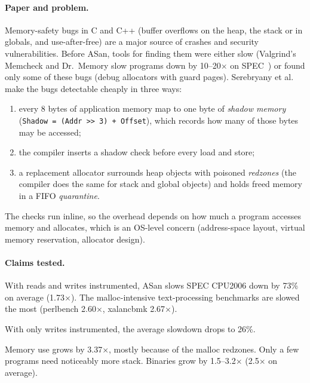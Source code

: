 \documentclass[10pt,a4paper]{article}
\newcommand{\asan}{ASan}
\newcommand{\cmd}[1]{\texttt{#1}}
\begin{document}
\paragraph{Paper and problem.}
Memory-safety bugs in C and C++ (buffer overflows on the heap, the stack or in
globals, and use-after-free) are a major source of crashes and security
vulnerabilities. Before \asan{}, tools for finding them were either slow
(Valgrind's Memcheck and Dr.~Memory slow programs down by 10--20$\times$ on
SPEC~\cite{asan}) or found only some of these bugs (debug allocators with
guard pages). Serebryany et al.~\cite{asan} make the bugs detectable cheaply in
three ways:
\begin{enumerate}
\item every 8 bytes of application memory map to one byte of \emph{shadow
memory} (\cmd{Shadow = (Addr >> 3) + Offset}), which records how many of
those bytes may be accessed;
\item the compiler inserts a shadow check before every load and store;
\item a replacement allocator surrounds heap objects with poisoned
\emph{redzones} (the compiler does the same for stack and global objects) and
holds freed memory in a FIFO \emph{quarantine}.
\end{enumerate}
The checks run inline, so the overhead depends on how much a program accesses
memory and allocates, which is an OS-level concern (address-space layout,
virtual memory reservation, allocator design).

\paragraph{Claims tested.}
\begin{description}[leftmargin=0pt]
\item[C1 (Figure 2, \S4).] With reads and writes instrumented, \asan{} slows
SPEC CPU2006 down by 73\% on average (1.73$\times$). The malloc-intensive
text-processing benchmarks are slowed the most (perlbench 2.60$\times$,
xalancbmk 2.67$\times$).
\item[C2 (Figure 2, \S4).] With only writes instrumented, the average slowdown
drops to 26\%.
\item[C3 (Tables 1--2, \S4).] Memory use grows by 3.37$\times$, mostly
because of the malloc redzones. Only a few programs need noticeably more
stack. Binaries grow by 1.5--3.2$\times$ (2.5$\times$ on average).
\end{description}
\end{document}
